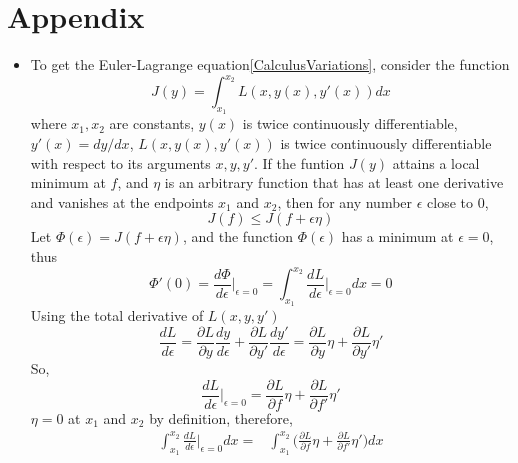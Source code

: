\documentclass[12pt, a4paper]{article}
\begin{document}
    \section{Appendix}
    \begin{itemize}
        \item To get the Euler-Lagrange equation\ref{CalculusVariations}, consider the function
        \begin{equation*}
            J(y)=\int_{x_1}^{x_2}L(x,y(x),y'(x))dx
        \end{equation*}
        where
        $x_1,x_2$ are constants, $y(x)$ is twice continuously differentiable, $y'(x)=dy/dx$, 
        $L(x,y(x),y'(x))$ is twice continuously differentiable with respect to its arguments $x,y,y'$.
        If the funtion $J(y)$ attains a local minimum at $f$, and $\eta$ is an arbitrary function 
        that has at least one derivative and vanishes at the endpoints $x_1$ and $x_2$, then for any 
        number $\epsilon$ close to 0,
        \begin{equation*}
            J(f)\le J(f+\epsilon\eta)
        \end{equation*}
        Let $\Phi(\epsilon)=J(f+\epsilon\eta)$, and the function $\Phi(\epsilon)$ has a minimum at
        $\epsilon=0$, thus
        \begin{equation*}
            \Phi'(0)=\frac{d\Phi}{d\epsilon}\Big\vert_{\epsilon=0}=\int_{x_1}^{x_2}\frac{dL}
            {d\epsilon}\Big\vert_{\epsilon=0}dx=0
        \end{equation*}
        Using the total derivative of $L(x,y,y')$
        \begin{equation*}
            \frac{dL}{d\epsilon}=\frac{\partial L}{\partial y}\frac{dy}{d\epsilon}+
            \frac{\partial L}{\partial y'}\frac{dy'}{d\epsilon}=\frac{\partial L}{\partial y}\eta
            +\frac{\partial L}{\partial y'}\eta'
        \end{equation*}
        So,
        \begin{equation*}
            \frac{dL}{d\epsilon}\Big\vert_{\epsilon=0}=\frac{\partial L}{\partial f}\eta
            +\frac{\partial L}{\partial f'}\eta'
        \end{equation*}
        $\eta=0$ at $x_1$ and $x_2$ by definition, therefore,
        \begin{align*}
            \int_{x_1}^{x_2}\frac{dL}{d\epsilon}\Big\vert_{\epsilon=0}dx=&\int_{x_1}^{x_2}\Big
            (\frac{\partial L}{\partial f}\eta+\frac{\partial L}{\partial f'}\eta'\Big)dx\\

\end{align*}
\end{itemize}
\end{document}
